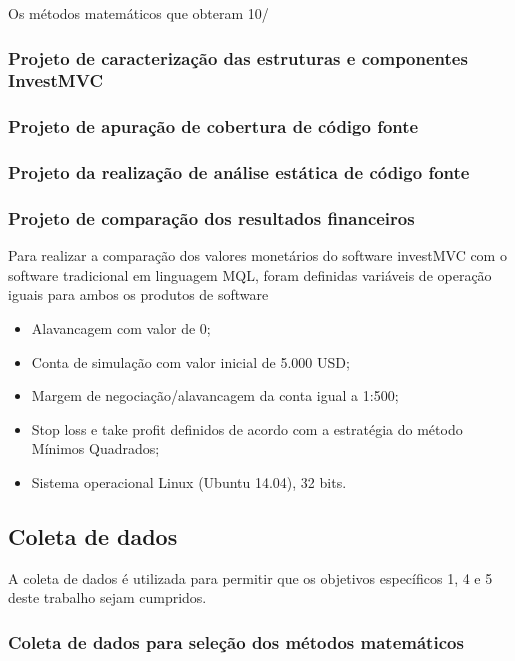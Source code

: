 Os métodos matemáticos que obteram 10/%

\subsubsection{Projeto de caracterização das estruturas e componentes InvestMVC}
\subsubsection{Projeto de apuração de cobertura de código fonte}
\subsubsection{Projeto da realização de análise estática de código fonte}
\subsubsection{Projeto de comparação dos resultados financeiros}

Para realizar a comparação dos valores monetários do software investMVC com o software tradicional em linguagem MQL, foram definidas variáveis de operação iguais para ambos os produtos de software

\begin{itemize}
\item Alavancagem com valor de 0;
\item Conta de simulação com valor inicial de 5.000 USD;
\item Margem de negociação/alavancagem da conta igual a 1:500;
\item Stop loss e take profit definidos de acordo com a estratégia do método Mínimos Quadrados;
\item Sistema operacional Linux (Ubuntu 14.04), 32 bits.
\end{itemize}

\subsection{Coleta de dados}

A coleta de dados é utilizada para permitir que os objetivos específicos 1, 4 e 5 deste trabalho sejam cumpridos.

\subsubsection{Coleta de dados para seleção dos métodos matemáticos}

